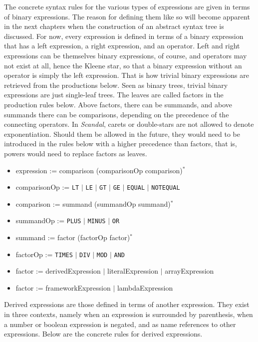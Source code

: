 The concrete syntax rules for the various types of expressions are given in terms of binary expressions. The reason for defining them like so will become apparent in the next chapters when the construction of an abstract syntax tree is discussed. For now, every expression is defined in terms of a binary expression that has a left expression, a right expression, and an operator. Left and right expressions can be themselves binary expressions, of course, and operators may not exist at all, hence the Kleene star, so that a binary expression without an operator is simply the left expression. That is how trivial binary expressions are retrieved from the productions below. Seen as binary trees, trivial binary expressions are just single-leaf trees. The leaves are called factors in the production rules below. Above factors, there can be summands, and above summands there can be comparisons, depending on the precedence of the connecting operators. In \emph{Scandal}, carets or double-stars are not allowed to denote exponentiation. Should them be allowed in the future, they would need to be introduced in the rules below with a higher precedence than factors, that is, powers would need to replace factors as leaves.

\begin{itemize}
	\item expression := comparison (comparisonOp comparison)$^*$
	\item comparisonOp := \texttt{LT} $|$ \texttt{LE} $|$ \texttt{GT} $|$ \texttt{GE} $|$ \texttt{EQUAL} $|$ \texttt{NOTEQUAL}
	\item comparison := summand (summandOp summand)$^*$
	\item summandOp := \texttt{PLUS} $|$ \texttt{MINUS} $|$ \texttt{OR}
	\item summand := factor (factorOp factor)$^*$
	\item factorOp := \texttt{TIMES} $|$ \texttt{DIV} $|$ \texttt{MOD} $|$ \texttt{AND}
	\item factor := derivedExpression $|$ literalExpression $|$ arrayExpression
	\item factor := frameworkExpression $|$ lambdaExpression
\end{itemize}

Derived expressions are those defined in terms of another expression. They exist in three contexts, namely when an expression is surrounded by parenthesis, when a number or boolean expression is negated, and as name references to other expressions. Below are the concrete rules for derived expressions.

